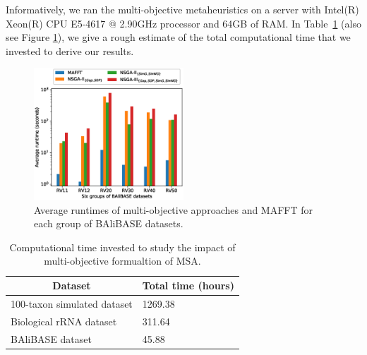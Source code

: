 Informatively, we ran the multi-objective metaheuristics on a server with Intel(R) Xeon(R) CPU E5-4617 @ 2.90GHz processor and 64GB of RAM. In Table~\ref{tab:time} (also see Figure \ref{fig:runtime_comp}), we give a rough estimate of the total computational time that we invested to derive our results.



\begin{figure}[!htbp] 
	\centering
	\includegraphics[width=0.5\textwidth]{Figure/balibase_runtime_comparison}
	\caption{Average runtimes of multi-objective approaches and MAFFT for each group of BAliBASE datasets.} 
	\label{fig:runtime_comp}
\end{figure}


\begin{table}[htbp]
	\small
	\centering
	\caption{Computational time invested to study the impact of multi-objective formualtion of MSA.}
	\begin{tabular}{|l|l|}
		\hline 
		\multicolumn{1}{|c|}{Dataset} & \multicolumn{1}{c|}{Total time (hours)} \\ 
		\hline 
		100-taxon simulated dataset &  1269.38\\ 
		\hline 
		Biological rRNA dataset &  311.64\\ 
		\hline 
		BAliBASE dataset &  45.88\\ 
		\hline 
	\end{tabular} 
	\label{tab:time}%
\end{table}%



